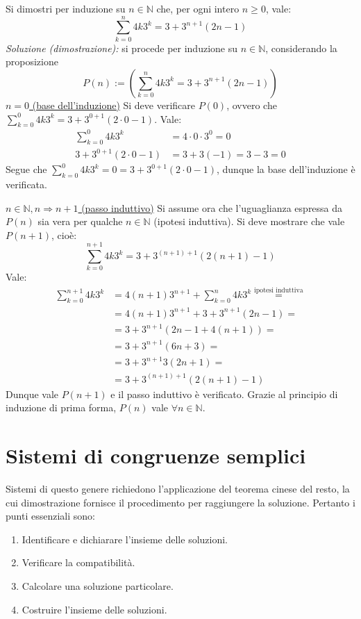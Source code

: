\documentclass[oneside]{book}
\begin{document}
\begin{tcolorbox}[enhanced, breakable, colback=blue!30, colframe=blue!30!black, title=Esempio]
Si dimostri per induzione su $n\in\mathbb{N}$ che, per ogni intero $n\geq0$,
vale: \[ \sum_{k=0}^{n}4k3^k=3+3^{n+1}(2n-1) \]
\textit{Soluzione (dimostrazione):} si procede per induzione su $n\in\mathbb{N}$,
considerando la proposizione \[P(n):=\left( \sum_{k=0}^{n}4k3^k=3+3^{n+1}(2n-1) \right)\]
\underline{$n=0$ (base dell'induzione)} Si deve verificare $P(0)$,
ovvero che $\sum_{k=0}^{0}4k3^k=3+3^{0+1}(2\cdot0-1)$.
Vale:
\begin{align*}
\sum_{k=0}^{0}4k3^k  &=4\cdot0\cdot3^0=0\\
3+3^{0+1}(2\cdot0-1) &=3+3(-1)=3-3=0
\end{align*}
Segue che $\sum_{k=0}^{0}4k3^k=0=3+3^{0+1}(2\cdot0-1)$, dunque la base
dell'induzione è verificata.

\underline{$n\in\mathbb{N},n\Longrightarrow n+1$ (passo induttivo)}
Si assume ora che l'uguaglianza espressa da $P(n)$ sia vera per
qualche $n\in\mathbb{N}$ (ipotesi induttiva). Si deve mostrare che
vale $P(n+1)$, cioè:
\[ \sum_{k=0}^{n+1}4k3^k=3+3^{(n+1)+1}(2(n+1)-1) \]
Vale:
\begin{align*}
\sum_{k=0}^{n+1}4k3^k &=4(n+1)3^{n+1} + \sum_{k=0}^{n}4k3^k \stackrel{\text{ipotesi induttiva}}{=}\\
                        &=4(n+1)3^{n+1} + 3+3^{n+1}(2n-1) =\\
                        &=3+3^{n+1}(2n-1+4(n+1)) =\\
                        &=3+3^{n+1}(6n+3) =\\
                        &=3+3^{n+1}3(2n+1) =\\
                        &=3+3^{(n+1)+1}(2(n+1)-1)
\end{align*}
Dunque vale $P(n+1)$ e il passo induttivo è verificato. Grazie al
principio di induzione di prima forma, $P(n)$ vale $\forall n\in\mathbb{N}$.
\end{tcolorbox}




\section{Sistemi di congruenze semplici}
Sistemi di questo genere richiedono l'applicazione del teorema cinese
del resto, la cui dimostrazione fornisce il procedimento per raggiungere la
soluzione. Pertanto i punti essenziali sono:
\begin{enumerate}
\item Identificare e dichiarare l'insieme delle soluzioni.
\item Verificare la compatibilità.
\item Calcolare una soluzione particolare.
\item Costruire l'insieme delle soluzioni.
\end{enumerate}
\end{document}
